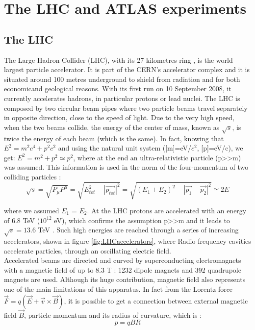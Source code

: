 \chapter{The LHC and ATLAS experiments} \label{chap:LHCAtlas}

\section{The LHC} \label{sec:LHC}
The Large Hadron Collider (LHC), with its 27 kilometres ring \cite{LHCguide}, is the world largest particle accelerator. It is part of the CERN’s accelerator complex and it is situated around 100 metres underground to shield from radiation and for both economic\footnotemark and geological reasons. With its first run on 10 September 2008, it currently accelerates hadrons, in particular protons or lead nuclei. The LHC is composed by two circular beam pipes where two particle beams travel separately in opposite direction, close to the speed of light. Due to the very high speed, when the two beams collide, the energy of the center of mass, known as $\sqrt{s}$, is twice the energy of each beam (which is the same). In fact, knowing that $E^2=m^2c^4+p^2c^2$ and using the natural unit system ([m]=eV/$c^2$, [p]=eV/c), we get: $E^2=m^2+p^2\simeq p^2$, where at the end an ultra-relativistic particle (p>>m) was assumed. This information is used in the norm of the four-momentum of two colliding particles \cite{Bini}:
\begin{equation}\label{eq:centerofmasseq}
    \sqrt{s}=\sqrt{P_{\mu}P^{\mu}}=\sqrt{E_{tot}^2-|\Vec{p_{tot}}|^2}=\sqrt{(E_1+E_2)^2-|\Vec{p_1}-\Vec{p_2}|^2}\simeq 2 E
\end{equation}


\noindent where we assumed $E_1$ = $E_2$. At the LHC protons are accelerated with an energy of 6.8 TeV ($10^{12}$ eV), which confirms the assumption p>>m and it leads to $\sqrt{s}=13.6$ TeV \cite{LHCreport}. Such high energies are reached through a series of increasing accelerators, shown in figure \ref{fig:LHCaccelerators}, where Radio-frequency cavities accelerate particles, through an oscillating electric field.\\
Accelerated beams are directed and curved by superconducting electromagnets with a magnetic field of up to 8.3 T \cite{PhDFrattari}: 1232 dipole magnets and 392 quadrupole magnets are used. Although its huge contribution, magnetic field also represents one of the main limitations of this apparatus. In fact from the Lorentz force $\Vec{F}=q(\Vec{E}+\Vec{v}\times \Vec{B})$, it is possible to get a connection between external magnetic field $\Vec{B}$, particle momentum and its radius of curvature, which is \cite{Bini}:
\begin{equation}\label{eq:pqBR}
    p = qBR
\end{equation}

